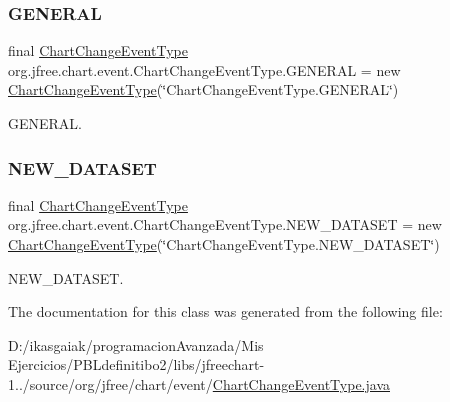 \subsubsection{\texorpdfstring{G\+E\+N\+E\+R\+AL}{GENERAL}}
{\footnotesize\ttfamily final \mbox{\hyperlink{classorg_1_1jfree_1_1chart_1_1event_1_1_chart_change_event_type}{Chart\+Change\+Event\+Type}} org.\+jfree.\+chart.\+event.\+Chart\+Change\+Event\+Type.\+G\+E\+N\+E\+R\+AL = new \mbox{\hyperlink{classorg_1_1jfree_1_1chart_1_1event_1_1_chart_change_event_type}{Chart\+Change\+Event\+Type}}(\char`\"{}Chart\+Change\+Event\+Type.\+G\+E\+N\+E\+R\+AL\char`\"{})\hspace{0.3cm}{\ttfamily [static]}}

G\+E\+N\+E\+R\+AL. \mbox{\label{classorg_1_1jfree_1_1chart_1_1event_1_1_chart_change_event_type_afe0628066c1b7b983e0fb629ec7c2f77}} 
\subsubsection{\texorpdfstring{N\+E\+W\+\_\+\+D\+A\+T\+A\+S\+ET}{NEW\_DATASET}}
{\footnotesize\ttfamily final \mbox{\hyperlink{classorg_1_1jfree_1_1chart_1_1event_1_1_chart_change_event_type}{Chart\+Change\+Event\+Type}} org.\+jfree.\+chart.\+event.\+Chart\+Change\+Event\+Type.\+N\+E\+W\+\_\+\+D\+A\+T\+A\+S\+ET = new \mbox{\hyperlink{classorg_1_1jfree_1_1chart_1_1event_1_1_chart_change_event_type}{Chart\+Change\+Event\+Type}}(\char`\"{}Chart\+Change\+Event\+Type.\+N\+E\+W\+\_\+\+D\+A\+T\+A\+S\+ET\char`\"{})\hspace{0.3cm}{\ttfamily [static]}}

N\+E\+W\+\_\+\+D\+A\+T\+A\+S\+ET. 

The documentation for this class was generated from the following file\+:\begin{DoxyCompactItemize}
\item 
D\+:/ikasgaiak/programacion\+Avanzada/\+Mis Ejercicios/\+P\+B\+Ldefinitibo2/libs/jfreechart-\/1../source/org/jfree/chart/event/\mbox{\hyperlink{_chart_change_event_type_8java}{Chart\+Change\+Event\+Type.\+java}}\end{DoxyCompactItemize}
